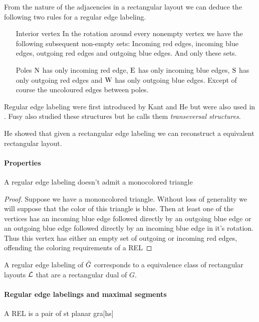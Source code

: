   From the nature of the adjacencies in a rectangular layout we can deduce the following two rules for a regular edge labeling.
  \begin{enumerate}
    \item [Interior vertex] In the rotation around every nonempty vertex we have the following subsequent non-empty sets: Incoming red edges, incoming blue edges, outgoing red edges and outgoing blue edges. And only these sets.
    \item [Poles] $\mathrm{N}$ has only incoming red edge, $\mathrm{E}$ has only incoming blue edges, $\mathrm{S}$ has only outgoing red edges and $\mathrm{W}$ has only outgoing blue edges. Except of course the uncoloured edges between poles.
  \end{enumerate}

  Regular edge labeling were first introduced by Kant and He \cite{Kant1997} but were also used in \cite{Eppstein2012}. Fusy also studied these structures \cite{Fusy2006,Fusy2009} but he calls them \emph{transeversal structures}.

  He showed \cite{He} that given a rectangular edge labeling we can reconstruct a equivalent rectangular layout.

  \paragraph{Properties}
  \begin{lemma}
    \label{lm:rel:noMonoColoredTriangles}
    A regular edge labeling doesn't admit a monocolored triangle
  \end{lemma}

  \begin{proof}
    Suppose we have a mononcolored triangle. Without loss of generality we will suppose that the color of this triangle is blue. Then at least one of the vertices has an incoming blue edge followed directly by an outgoing blue edge or an outgoing blue edge followed directly by an incoming blue edge in it's rotation. Thus this vertex has either an empty set of outgoing or incoming red edges, offending the coloring requirements of a REL
  \end{proof}

  A regular edge labeling  of $\bar{G}$ corresponds to a equivalence class of rectangular layouts $\mathcal{L}$ that are a rectangular dual of $G$.

  \paragraph{Regular edge labelings and maximal segments}
  A REL is a pair of st planar gra[hs]

